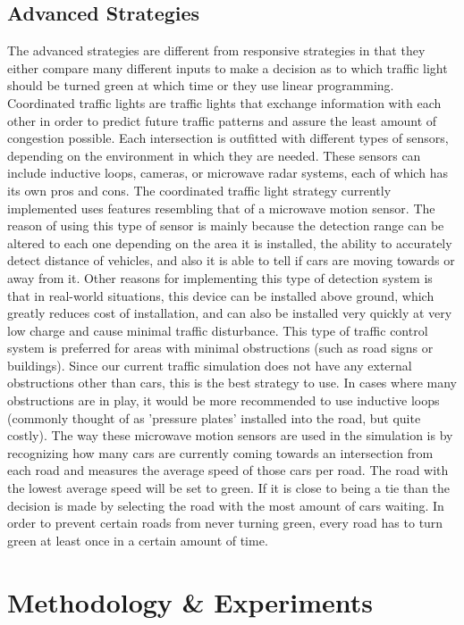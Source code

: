 \documentclass[10pt]{article}
\begin{document}
\subsection{Advanced Strategies}
The advanced strategies are different from responsive strategies in that they either compare many different inputs to make a decision as to which traffic light should be turned green at which time or they use linear programming. Coordinated traffic lights are traffic lights that exchange information with each other in order to predict future traffic patterns and assure the least amount of congestion possible. Each intersection is outfitted with different types of sensors, depending on the environment in which they are needed. These sensors can include inductive loops, cameras, or microwave radar systems, each of which has its own pros and cons. The coordinated traffic light strategy currently implemented uses features resembling that of a microwave motion sensor. The reason of using this type of sensor is mainly because the detection range can be altered to each one depending on the area it is installed, the ability to accurately detect distance of vehicles, and also it is able to tell if cars are moving towards or away from it. Other reasons for implementing this type of detection system is that in real-world situations, this device can be installed above ground, which greatly reduces cost of installation, and can also be installed very quickly at very low charge and cause minimal traffic disturbance. This type of traffic control system is preferred for areas with minimal obstructions (such as road signs or buildings). Since our current traffic simulation does not have any external obstructions other than cars, this is the best strategy to use. In cases where many obstructions are in play, it would be more recommended to use inductive loops (commonly thought of as ’pressure plates’ installed into the road, but quite costly). The way these microwave motion sensors are used in the simulation is by recognizing how many cars are currently coming towards an intersection from each road and measures the average speed of those cars per road. The road with the lowest average speed will be set to green. If it is close to being a tie than the decision is made by selecting the road with the most amount of cars waiting. In order to prevent certain roads from never turning green, every road has to turn green at least once in a certain amount of time. 

\section{Methodology \& Experiments}
\label{sec:experiments}
\end{document}
